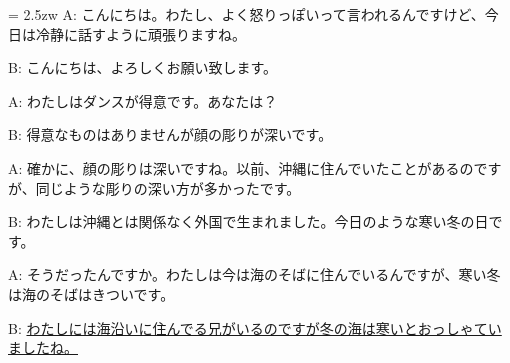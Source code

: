 \documentclass[11pt]{amsart}
\title{}
\author{}
\newenvironment{hangall}[1]{\hangindent = 2.5zw\everypar{\hangindent = 2.5zw}}{}
\begin{document}
\maketitle
\begin{hangall}{}%
A: こんにちは。わたし、よく怒りっぽいって言われるんですけど、今日は冷静に話すように頑張りますね。

B: こんにちは、よろしくお願い致します。

A: わたしはダンスが得意です。あなたは？

B: 得意なものはありませんが顔の彫りが深いです。

A: 確かに、顔の彫りは深いですね。以前、沖縄に住んでいたことがあるのですが、同じような彫りの深い方が多かったです。

B: わたしは沖縄とは関係なく外国で生まれました。今日のような寒い冬の日です。

A: そうだったんですか。わたしは今は海のそばに住んでいるんですが、寒い冬は海のそばはきついです。

B: \ul{わたしには海沿いに住んでる兄がいるのですが冬の海は寒いとおっしゃていましたね。}\end{hangall}
\end{document}
